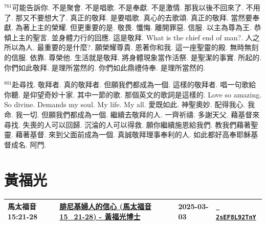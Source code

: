 \documentclass{book}
\begin{document}
$^{761}$可能告訴你.
不是聚會.
不是唱歌.
不是奉獻.
不是激情.
那我以後不回來了.
不用了.
那又不要想大了.
真正的敬拜.
是要唱歌.
真心的去歌頌.
真正的敬拜.
當然要奉獻.
為著上主的榮耀.
但更重要的是.
敬畏.
懺悔.
離開罪惡.
信服.
以主為尊為王.
恭傾上主的聖言.
並身體力行的回應.
這是敬拜.
What is the chief end of man?.
人之所以為人.
最重要的是什麼?.
願榮耀尊貴.
恩著你和我.
這一座聖靈的殿.
無時無刻的信服.
依靠.
尊榮他.
生活就是敬拜.
將身體現象當作活祭.
是聖潔的事實.
所起的.
你們如此敬拜.
是理所當然的.
你們如此鼎禮侍奉.
是理所當然的.

$^{801}$赴尋找.
敬拜者.
真的敬拜者.
但願我們都成為一個.
這樣的敬拜者.
唱一句歌給你聽.
是仰望奇妙十家.
其中一節的歌.
那個英文的歌詞是這樣的.
Love so amazing.
So divine.
Demands my soul.
My life.
My all.
愛既如此.
神聖奧妙.
配得我心.
我命.
我一切.
但願我們都成為一個.
繼續去敬拜的人.
一齊祈禱.
多謝天父.
藉基督來尋找.
失喪的人可以回歸.
沉淪的人可以得救.
願你繼續施恩給我們.
教我們藉著聖靈.
藉著基督.
來到父面前成為一個.
真誠敬拜理事奉利的人.
如此都好高奉耶穌基督成名.
阿門.
\newpage



\chapter{黃福光}\label{ch:preacher14}
\begin{multicols}{3}
\minitoc
\end{multicols}
{ \scriptsize


\begin{xltabular}{\textwidth}{|p{0.15\textwidth} p{0.6\textwidth}|p{0.07\textwidth} p{0.1\textwidth}|}
\hline
馬太福音 15:21-28 & \hyperref[sec:2sEF8L92TnY]{腓尼基婦人的信心 (馬太福音15\_21-28) - 黃福光博士} & 2025-03-03 & \href{https://youtube.com/watch?v=2sEF8L92TnY}{\texttt{ 2sEF8L92TnY}} \\
\hline
\end{xltabular}
}
\newpage
\end{document}
